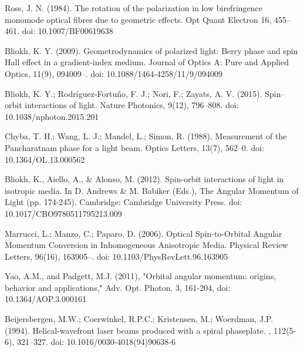 \documentclass[11pt,a4paper]{article}
\numberwithin{equation}{section}
\begin{document}
\begin{thebibliography}{999}
	  Ross, J. N. (1984). The rotation of the polarization in low birefringence monomode optical fibres due to geometric effects. Opt Quant Electron 16, 455–461. doi: 10.1007/BF00619638
	  
	  Bliokh, K. Y. (2009). Geometrodynamics of polarized light: Berry phase and spin Hall effect in a gradient-index medium. Journal of Optics A: Pure and Applied Optics, 11(9), 094009–. doi: 10.1088/1464-4258/11/9/094009
	   
	   Bliokh, K. Y.; Rodríguez-Fortuño, F. J.; Nori, F.; Zayats, A. V. (2015). Spin–orbit interactions of light. Nature Photonics, 9(12), 796–808. doi: 10.1038/nphoton.2015.201 
	  
	  Chyba, T. H.; Wang, L. J.; Mandel, L.; Simon, R. (1988). Measurement of the Pancharatnam phase for a light beam. Optics Letters, 13(7), 562–0. doi: 10.1364/OL.13.000562
	  
	  Bliokh, K., Aiello, A., \& Alonso, M. (2012). Spin-orbit interactions of light in isotropic media. In D. Andrews \& M. Babiker (Eds.), The Angular Momentum of Light (pp. 174-245). Cambridge: Cambridge University Press. doi: 10.1017/CBO9780511795213.009
	  
	  Marrucci, L.; Manzo, C.; Paparo, D. (2006). Optical Spin-to-Orbital Angular Momentum Conversion in Inhomogeneous Anisotropic Media. Physical Review Letters, 96(16), 163905–. doi: 10.1103/PhysRevLett.96.163905  
	  
	  Yao, A.M., and Padgett, M.J. (2011), "Orbital angular momentum: origins, behavior and applications," Adv. Opt. Photon. 3, 161-204, doi: 10.1364/AOP.3.000161
	  
       Beijersbergen, M.W.; Coerwinkel, R.P.C.; Kristensen, M.; Woerdman,  J.P. (1994). Helical-wavefront laser beams produced with a spiral phaseplate. , 112(5-6), 321–327. doi: 10.1016/0030-4018(94)90638-6     
	   
\end{thebibliography}

\clearpage
\newpage 
\thispagestyle{empty}
\vspace{7mm}
\begin{center}
	\vspace*{\fill}%
	\noindent
	\vfill
\end{center}
\end{document}
